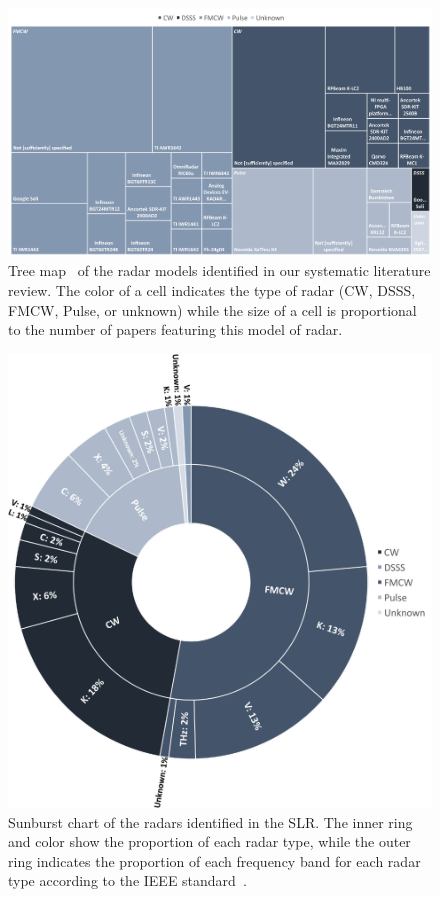 \begin{figure}[t]
    \centering
    \includegraphics[width=\linewidth]{Figures/StateOfTheArt/Radar/treemap-radar-types-models.pdf}
    \vspace{-16pt}
    \caption{Tree map~\cite{Shneiderman:1992} of the radar models identified in our systematic literature review. 
    The color of a cell indicates the type of radar (CW, DSSS, FMCW, Pulse, or unknown) while the size of a cell is proportional to the number of papers featuring this model of radar.}
    \label{fig:state_of_the_art:radar:radars}
\end{figure}

\begin{figure}[t]
    \centering
    \includegraphics[width=.6\linewidth]{Figures/StateOfTheArt/Radar/diagram-radar-types-frequencies.pdf}
    \vspace{-4pt}
    \caption{Sunburst chart of the radars identified in the SLR. The inner ring and color show the proportion of each radar type, while the outer ring indicates the proportion of each frequency band for each radar type according to the IEEE standard~\cite{IEEE:2020}.}
    \label{fig:state_of_the_art:radar:radars-types-frequencies}
    \vspace{-4pt}
\end{figure}

